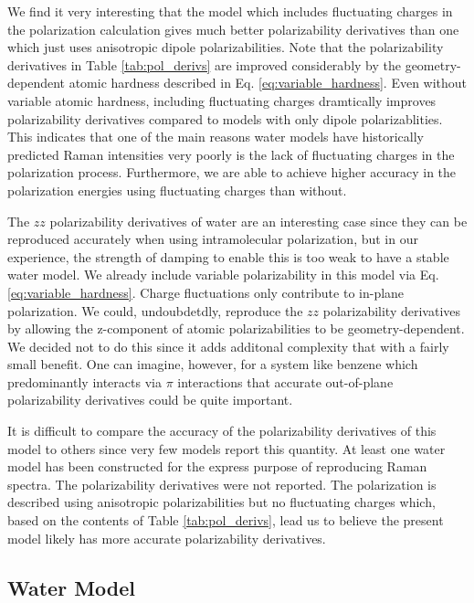 \documentclass[journal=jctcce,manuscript=article]{achemso}
\begin{document}
We find it very interesting that the model which includes fluctuating charges in the polarization calculation gives much better polarizability derivatives than one which just uses anisotropic dipole polarizabilities. Note that the polarizability derivatives in Table \ref{tab:pol_derivs} are improved considerably by the geometry-dependent atomic hardness described in Eq. \ref{eq:variable_hardness}. Even without variable atomic hardness, including fluctuating charges dramtically improves polarizability derivatives compared to models with only dipole polarizablities. This indicates that one of the main reasons water models have historically predicted Raman intensities very poorly\cite{hamm20142d} is the lack of fluctuating charges in the polarization process. Furthermore, we are able to achieve higher accuracy in the polarization energies using fluctuating charges than without.

The $zz$ polarizability derivatives of water are an interesting case since they can be reproduced accurately when using intramolecular polarization, but in our experience, the strength of damping to enable this is too weak to have a stable water model. We already include variable polarizability in this model via Eq. \ref{eq:variable_hardness}. Charge fluctuations only contribute to in-plane polarization. We could, undoubdetdly, reproduce the $zz$ polarizability derivatives by allowing the z-component of atomic polarizabilities to be geometry-dependent. We decided not to do this since it adds additonal complexity that with a fairly small benefit. One can imagine, however, for a system like benzene which predominantly interacts via $\pi$ interactions that accurate out-of-plane polarizability derivatives could be quite important.

It is difficult to compare the accuracy of the polarizability derivatives of this model to others since very few models report this quantity. At least one water model has been constructed for the express purpose of reproducing Raman spectra.\cite{sidler2018efficient} The polarizability derivatives were not reported. The polarization is described using anisotropic polarizabilities but no fluctuating charges which, based on the contents of Table \ref{tab:pol_derivs}, lead us to believe the present model likely has more accurate polarizability derivatives.

\subsection*{Water Model}
\end{document}
